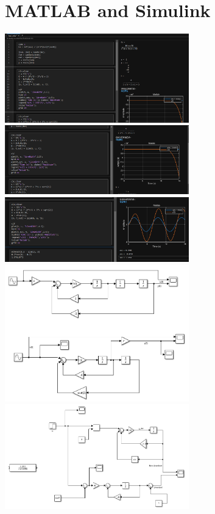 \documentclass[12pt]{article}
\begin{document}
\section*{MATLAB and Simulink}
        \begin{center}
            \includegraphics[width=0.6\textwidth]{matlab1.png}
            \includegraphics[width=0.6\textwidth]{matlab2.png}
            \includegraphics[width=0.6\textwidth]{matlab3.png}
            \includegraphics[width=0.6\textwidth]{simulink1.png}
            \includegraphics[width=0.6\textwidth]{simulink2.png}
        \end{center}
\end{document}
